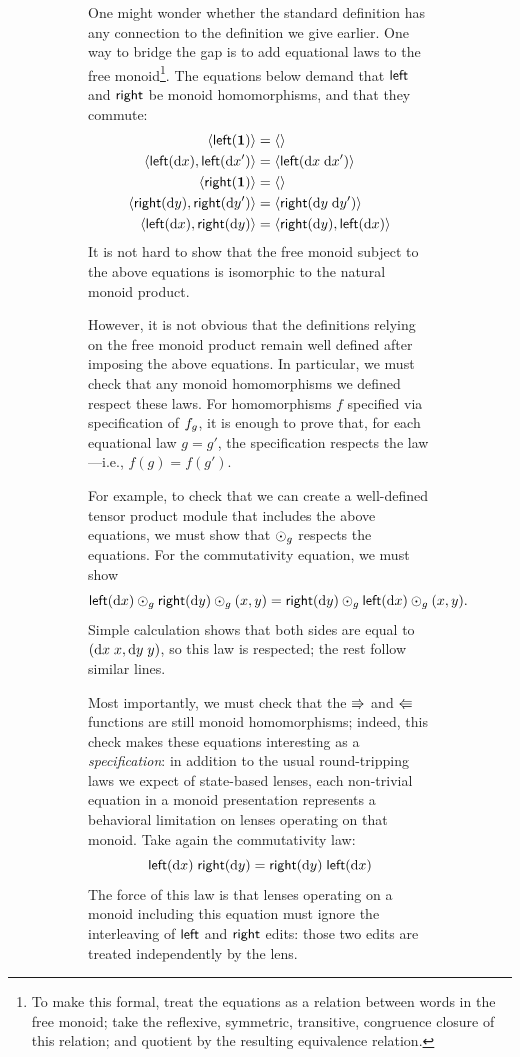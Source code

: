 \begin{figure}
\begin{figure}
One might wonder whether the standard definition has any connection to the
definition we give earlier. One way to bridge the gap is to add equational
laws to the free monoid\footnote{To make this formal, treat the
equations as a relation between words in the free monoid; take the
reflexive, symmetric, transitive, congruence closure of this relation; and
quotient by the resulting equivalence relation.}. The equations below demand
that $\mathsf{left}$ and $\mathsf{right}$ be monoid homomorphisms, and that they
commute:
\begin{align*}
    \left<\mathsf{left}(\mbox{\bf{1}})\right> &= \left<\right> \\
    \left<\mathsf{left}(\textrm{d} x),\mathsf{left}(\textrm{d} x')\right> &= \left<\mathsf{left}(\textrm{d} x\;\textrm{d} x')\right> \\
    \left<\mathsf{right}(\mbox{\bf{1}})\right> &= \left<\right> \\
    \left<\mathsf{right}(\textrm{d} y),\mathsf{right}(\textrm{d} y')\right> &= \left<\mathsf{right}(\textrm{d} y\;\textrm{d} y')\right> \\
    \left<\mathsf{left}(\textrm{d} x),\mathsf{right}(\textrm{d} y)\right> &= \left<\mathsf{right}(\textrm{d} y),\mathsf{left}(\textrm{d} x)\right>
\end{align*}
It is not hard to show that the free monoid subject to the above
equations is isomorphic to the natural monoid product.

However, it is not obvious that the definitions relying on the free monoid
product remain well defined after imposing the above equations. In
particular, we must check that any monoid homomorphisms we defined respect
these laws. For homomorphisms $f$ specified via specification
of $f_g$, it is enough to prove that, for each equational law $g=g'$, the
specification respects the law---i.e., $f(g)=f(g')$.

For example, to check that we can create a well-defined tensor product
module that includes the above equations, we must show that $\odot_g$
respects the equations. For the commutativity equation, we must show 
\[\mathsf{left}(\textrm{d} x)\odot_g\mathsf{right}(\textrm{d} y)\odot_g(x,y) =
\mathsf{right}(\textrm{d} y)\odot_g\mathsf{left}(\textrm{d} x)\odot_g(x,y).\]
Simple calculation shows that both sides are equal to $(\textrm{d} x\;x,\textrm{d} y\;y)$, so
this law is respected; the rest follow similar lines.

Most importantly, we must check that the $\mathord{\Rrightarrow}$ and $\mathord{\Lleftarrow}$ functions are
still monoid homomorphisms; indeed, this check
makes these equations interesting as a {\em specification}: 
in addition to the usual round-tripping laws we expect of
state-based lenses, each non-trivial equation in a monoid presentation
represents a behavioral limitation on lenses operating on that monoid.
Take again the commutativity law:
\[\mathsf{left}(\textrm{d} x)\;\mathsf{right}(\textrm{d} y) = \mathsf{right}(\textrm{d} y)\;\mathsf{left}(\textrm{d} x)\]
The force of this law is that lenses operating on a monoid including this
equation must ignore the interleaving of $\mathsf{left}$ and $\mathsf{right}$ edits:
those two edits are treated independently by the lens.


\end{figure}
\end{figure}
